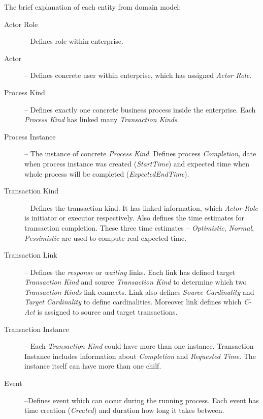The brief explanation of each entity from domain model:
\begin{description}
\item[Actor Role] -- Defines role within enterprise. 
\item[Actor] -- Defines concrete user within enterprise, which has assigned \textit{Actor Role}.

\item[Process Kind] -- Defines exactly one concrete business process inside the enterprise. Each \textit{Process Kind} has linked many \textit{Transaction Kinds}.

\item[Process Instance] -- The instance of concrete \textit{Process Kind}. Defines process \textit{Completion}, date when process instance was created (\textit{StartTime}) and expected time when whole process will be completed (\textit{ExpectedEndTime}).

\item[Transaction Kind] -- Defines the transaction kind. It has linked information, which \textit{Actor Role} is initiator or executor respectively. Also defines the time estimates for transaction completion. These three time estimates -- \textit{Optimistic}, \textit{Normal}, \textit{Pessimistic} are used to compute real expected time. 

\item[Transaction Link] -- Defines the \textit{response} or \textit{waiting} links. Each link has defined target \textit{Transaction Kind} and source \textit{Transaction Kind} to determine which two \textit{Transaction Kinds} link connects. Link also defines \textit{Source Cardinality} and \textit{Target Cardinality} to define cardinalities. Moreover link defines which \textit{C-Act} is assigned to source and target transactions.  

\item[Transaction Instance] -- Each \textit{Transaction Kind} could have more than one instance. Transaction Instance includes information about \textit{Completion} and \textit{Requested Time}. The instance itself can have more than one chilf. 

\item[Event] --Defines event which can occur during the running process. Each event has time creation (\textit{Created}) and duration how long it takes between.

\end{description}

